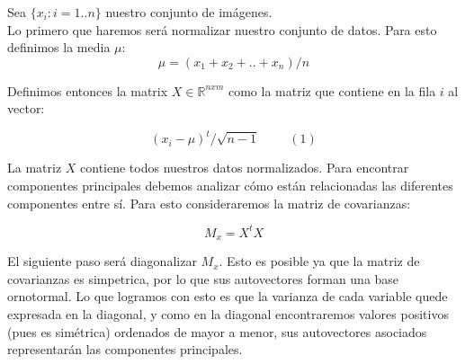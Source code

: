 
Sea $\{ x_i : i = 1 .. n\}$ nuestro conjunto de imágenes.  \\

Lo primero que haremos será normalizar nuestro conjunto de datos. Para esto definimos la media $\mu$:
$$ \mu = (x_1 + x_2 + .. + x_n) / n $$

Definimos entonces la matrix $X \in \mathbb{R}^{n x m}$ como la matriz que contiene en la fila $i$ al vector:

$$ (x_i - \mu)^{t} / \sqrt{n-1} \hspace{1cm}(1) $$

La matriz $X$ contiene todos nuestros datos normalizados. Para encontrar componentes principales debemos analizar cómo están relacionadas las diferentes componentes entre sí. Para esto consideraremos la matriz de covarianzas:

$$M_x = X^t X$$

El siguiente paso será diagonalizar $M_x$. Esto es posible ya que la matriz de covarianzas es simpetrica, por lo que sus autovectores forman una base ornotormal. Lo que logramos con esto es que la varianza de cada variable quede expresada en la diagonal, y como en la diagonal encontraremos valores positivos (pues es simétrica) ordenados de mayor a menor, sus autovectores asociados representarán las componentes principales.

